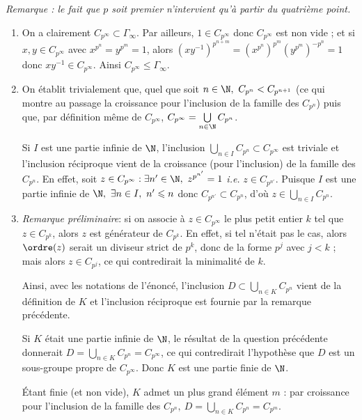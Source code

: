 \emph{Remarque : le fait que $p$ soit premier n'intervient qu'à partir du quatrième point.}

\begin{enumerate}
    \item On a clairement $C_{p^{\infty}}\subset \Gamma_{\infty}$. Par ailleurs, $1\in C_{p^{\infty}}$ donc $C_{p^{\infty}}$ est non vide ; et si $x, y\in C_{p^{\infty}}$ avec $x^{p^n}=y^{p^m} = 1$, 
    alors $\left(x y^{-1}\right)^{p^{n+m}} = \left(x^{p^n}\right)^{p^{m}} \left(y^{p^m}\right)^{-p^{n}} = 1$ donc $x y^{-1}\in C_{p^{\infty}}$. Ainsi $C_{p^{\infty}} \leqslant  \Gamma_{\infty}$.
    \item On établit trivialement que, quel que soit $n\in \N,~ C_{p^n} < C_{p^{n+1}}$ (ce qui montre au passage la croissance pour l'inclusion de la famille des $C_{p^n}$) puis que, par définition même de $C_{p^{\infty}}$, $C_{p^{\infty}} = \bigcup\limits_{n\in \N} C_{p^n}$.
    
    Si $I$ est une partie infinie de $\N$, l'inclusion $\bigcup\limits_{n\in I} C_{p^n} \subset C_{p^{\infty}}$ est triviale et l'inclusion réciproque vient de la croissance (pour l'inclusion) de 
    la famille des $C_{p^n}$. En effet, soit $z\in C_{p^{\infty}} : \exists n'\in \N,~ z^{p^{n'}} = 1$ \textit{i.e.} $z\in C_{p^{n'}}$. Puisque $I$ est une partie infinie de 
    $\N,~ \exists n\in I,~ n' \leqslant n$ donc $C_{p^{n'}}\subset C_{p^{n}}$, d'où $z\in \bigcup\limits_{n\in I} C_{p^n}$.
    \item \emph{Remarque préliminaire}: si on associe à $z\in C_{p^{\infty}}$ le plus petit entier $k$ tel que $z\in C_{p^k}$, alors $z$ est générateur de  $C_{p^k}$. En effet, si tel n'était pas le cas, 
    alors $\ordre(z)$ serait un diviseur strict de $p^k$, donc de la forme $p^j$ avec $j<k$ ; mais alors $z\in C_{p^j}$, ce qui contredirait la minimalité de $k$.

    Ainsi, avec les notations de l'énoncé, l'inclusion $D \subset \bigcup\limits_{n\in K} C_{p^n}$ vient de la définition de $K$ et l'inclusion réciproque est fournie par la remarque précédente.\medskip
    
    
    Si $K$ était une partie infinie de $\N$, le résultat de la question précédente donnerait $D = \bigcup\limits_{n\in K} C_{p^n} = C_{p^{\infty}}$, ce qui contredirait l'hypothèse que 
    $D$ est un sous-groupe propre de $C_{p^{\infty}}$. Donc $K$ est une partie finie de $\N$.

    Étant finie (et non vide), $K$ admet un plus grand élément $m$ : par croissance pour l'inclusion de la famille des $C_{p^n},~ D = \bigcup\limits_{n\in K} C_{p^n}  = C_{p^m}$.


\end{enumerate}
